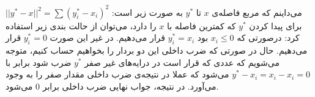 \\\\
می‌داینم که مربع فاصله‌ی
$x$ تا $y^*$
به صورت زیر است:
$||y^*-x||^2 = \sum (y^*_i-x_i)^2$
برای پیدا کردن
$y^*$
که کمترین فاصله با
$x$
را دارد،
می‌توان از حالت بندی زیر استفاده کرد: درصورتی که
$x_i \le 0$
بود
$y^*_i = x_i$
قرار می‌دهیم.
در غیر این صورت
$y^*_i = 0$
قرار می‌دهیم.
حال در صورتی که ضرب داخلی این دو بردار را بخواهیم حساب کنیم، متوجه می‌شویم که عددی که قرار است در درایه‌های
غیر صفر
$y^*$
ضرب شود برابر با
$y^* - x_i = x_i - x_i = 0$
می‌شود که عملا در نتیجه‌ی ضرب داخلی مقدار صفر را به وجود می‌آورد. در نتیجه، جواب نهایی ضرب داخلی برابر 0 می‌شود.